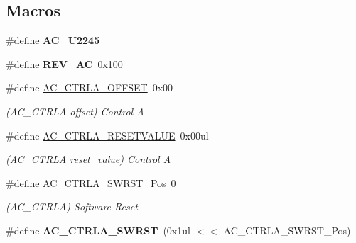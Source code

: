 \subsection*{Macros}
\begin{DoxyCompactItemize}
\item 
\hypertarget{group___s_a_m_l21___a_c_ga53aeece1057f55daedad8cd80f260a11}{}\#define {\bfseries A\+C\+\_\+\+U2245}\label{group___s_a_m_l21___a_c_ga53aeece1057f55daedad8cd80f260a11}

\item 
\hypertarget{group___s_a_m_l21___a_c_gad5caae49643e4b678d0e176955aa27b4}{}\#define {\bfseries R\+E\+V\+\_\+\+A\+C}~0x100\label{group___s_a_m_l21___a_c_gad5caae49643e4b678d0e176955aa27b4}

\item 
\hypertarget{group___s_a_m_l21___a_c_ga2b8253e09cb53fcb96e93f5d425a97b4}{}\#define \hyperlink{group___s_a_m_l21___a_c_ga2b8253e09cb53fcb96e93f5d425a97b4}{A\+C\+\_\+\+C\+T\+R\+L\+A\+\_\+\+O\+F\+F\+S\+E\+T}~0x00\label{group___s_a_m_l21___a_c_ga2b8253e09cb53fcb96e93f5d425a97b4}

\begin{DoxyCompactList}\small\item\em (A\+C\+\_\+\+C\+T\+R\+L\+A offset) Control A \end{DoxyCompactList}\item 
\hypertarget{group___s_a_m_l21___a_c_gac3bf7345c9e6bd9c13b215f211805368}{}\#define \hyperlink{group___s_a_m_l21___a_c_gac3bf7345c9e6bd9c13b215f211805368}{A\+C\+\_\+\+C\+T\+R\+L\+A\+\_\+\+R\+E\+S\+E\+T\+V\+A\+L\+U\+E}~0x00ul\label{group___s_a_m_l21___a_c_gac3bf7345c9e6bd9c13b215f211805368}

\begin{DoxyCompactList}\small\item\em (A\+C\+\_\+\+C\+T\+R\+L\+A reset\+\_\+value) Control A \end{DoxyCompactList}\item 
\hypertarget{group___s_a_m_l21___a_c_gab2cf4a760261959d3e1b82e930e1bb98}{}\#define \hyperlink{group___s_a_m_l21___a_c_gab2cf4a760261959d3e1b82e930e1bb98}{A\+C\+\_\+\+C\+T\+R\+L\+A\+\_\+\+S\+W\+R\+S\+T\+\_\+\+Pos}~0\label{group___s_a_m_l21___a_c_gab2cf4a760261959d3e1b82e930e1bb98}

\begin{DoxyCompactList}\small\item\em (A\+C\+\_\+\+C\+T\+R\+L\+A) Software Reset \end{DoxyCompactList}\item 
\hypertarget{group___s_a_m_l21___a_c_ga891d9849387c8a65811ddea96b12ab46}{}\#define {\bfseries A\+C\+\_\+\+C\+T\+R\+L\+A\+\_\+\+S\+W\+R\+S\+T}~(0x1ul $<$$<$ A\+C\+\_\+\+C\+T\+R\+L\+A\+\_\+\+S\+W\+R\+S\+T\+\_\+\+Pos)\label{group___s_a_m_l21___a_c_ga891d9849387c8a65811ddea96b12ab46}


\end{DoxyCompactItemize}
